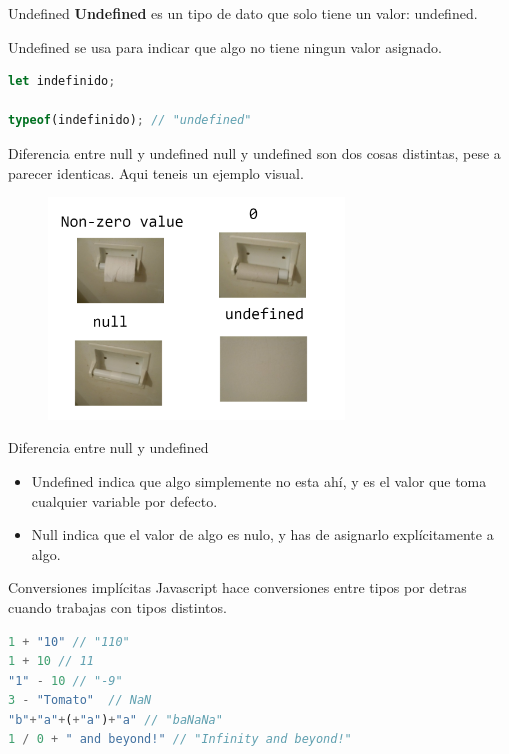 \documentclass{beamer}
\begin{document}
\begin{frame}[fragile]{Undefined}
\textbf{Undefined} es un tipo de dato que solo tiene un valor: undefined.

Undefined se usa para indicar que algo no tiene ningun valor asignado.

\begin{lstlisting}[language=JavaScript]
let indefinido;

typeof(indefinido); // "undefined"
\end{lstlisting}
\end{frame}

\begin{frame}{Diferencia entre null y undefined}
null y undefined son dos cosas distintas, pese a parecer identicas. Aqui teneis un ejemplo visual.

    \begin{figure}
        \centering
        \includegraphics[width=0.7\textwidth]{images/undefinednull.png}
    \end{figure}
\end{frame}

\begin{frame}{Diferencia entre null y undefined}
\begin{itemize}
    \item Undefined indica que algo simplemente no esta ahí, y es el valor que toma cualquier variable por defecto.
    \item Null indica que el valor de algo es nulo, y has de asignarlo explícitamente a algo.
\end{itemize}
\end{frame}

\begin{frame}[fragile]{Conversiones implícitas}
Javascript hace conversiones entre tipos por detras cuando trabajas con tipos distintos.

\begin{lstlisting}[language=JavaScript]
1 + "10" // "110"
1 + 10 // 11
"1" - 10 // "-9"
3 - "Tomato"  // NaN
"b"+"a"+(+"a")+"a" // "baNaNa"
1 / 0 + " and beyond!" // "Infinity and beyond!"
\end{lstlisting}
\end{frame}
\end{document}
